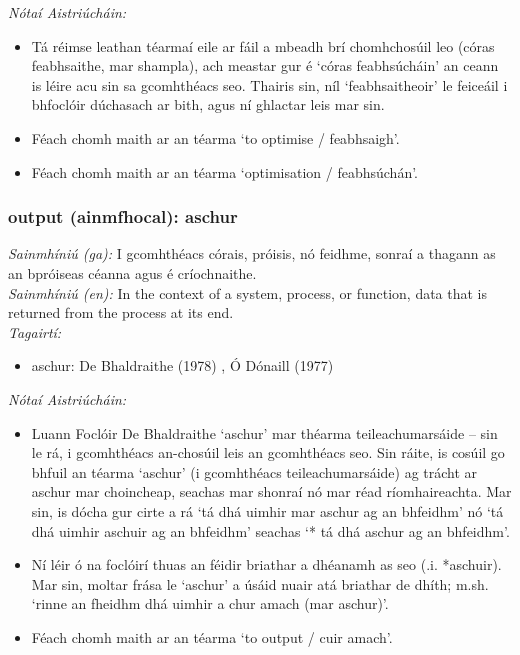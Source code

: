  \noindent \textit{Nótaí Aistriúcháin:}
\begin{itemize}
	\item Tá réimse leathan téarmaí eile ar fáil a mbeadh brí chomhchosúil leo (córas feabhsaithe, mar shampla), ach meastar gur é `córas feabhsúcháin' an ceann is léire acu sin sa gcomhthéacs seo. Thairis sin, níl `feabhsaitheoir' le feiceáil i bhfoclóir dúchasach ar bith, agus ní ghlactar leis mar sin.
	\item Féach chomh maith ar an téarma `to optimise / feabhsaigh'.
	\item Féach chomh maith ar an téarma `optimisation / feabhsúchán'.
\end{itemize}


\subsubsection*{output (ainmfhocal): aschur}
 \noindent \textit{Sainmhíniú (ga):} I gcomhthéacs córais, próisis, nó feidhme, sonraí a thagann as an bpróiseas céanna agus é críochnaithe.
\\
 \noindent \textit{Sainmhíniú (en):} In the context of a system, process, or function, data that is returned from the process at its end.
\\
 \noindent \textit{Tagairtí:}
\begin{itemize}
	\item aschur: De Bhaldraithe (1978) \cite{de-bhaldraithe}, Ó Dónaill (1977) \cite{odonaill}
\end{itemize}

 \noindent \textit{Nótaí Aistriúcháin:}
\begin{itemize}
	\item Luann Foclóir De Bhaldraithe `aschur' mar théarma teileachumarsáide -- sin le rá, i gcomhthéacs an-chosúil leis an gcomhthéacs seo. Sin ráite, is cosúil go bhfuil an téarma `aschur' (i gcomhthéacs teileachumarsáide) ag trácht ar aschur mar choincheap, seachas mar shonraí nó mar réad ríomhaireachta. Mar sin, is dócha gur cirte a rá `tá dhá uimhir mar aschur ag an bhfeidhm' nó `tá dhá uimhir aschuir ag an bhfeidhm' seachas `* tá dhá aschur ag an bhfeidhm'.
	\item Ní léir ó na foclóirí thuas an féidir briathar a dhéanamh as seo (.i. *aschuir). Mar sin, moltar frása le `aschur' a úsáid nuair atá briathar de dhíth; m.sh. `rinne an fheidhm dhá uimhir a chur amach (mar aschur)'.
	\item Féach chomh maith ar an téarma `to output / cuir amach'.
\end{itemize}



